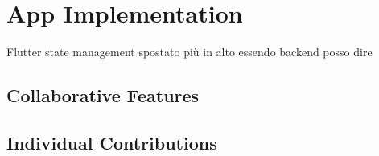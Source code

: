 \section{App Implementation}
Flutter state management spostato più in alto essendo backend posso dire
\subsection{Collaborative Features}

\subsection{Individual Contributions}